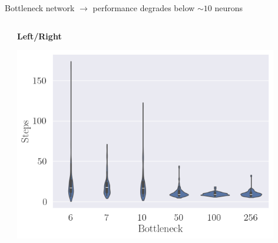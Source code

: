 \documentclass[bigger]{beamer}
\begin{document}
\begin{frame}[label={sec:org8212a43}]{Bottleneck network \(\to\) performance degrades below \(\sim\!10\) neurons}
\begin{columns}
\begin{column}[c]{0.5\columnwidth}
\begin{center}
\end{center}
\end{column}
\begin{column}[c]{0.5\columnwidth}
\begin{center}
\small
\textbf{Left/Right}\\
\end{center}
\begin{center}
\includegraphics[width=0.9\textwidth]{medias/steps-boxplot-LeftRight.png}
\end{center}
\end{column}
\end{columns}
\end{frame}
\end{document}
